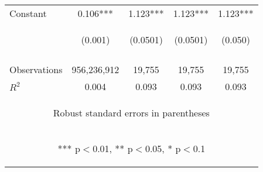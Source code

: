 \documentclass[]{article}
\begin{document}
\begin{center}
\begin{tabular}{lcccc}
Constant & 0.106*** & 1.123*** & 1.123*** & 1.123*** \\
 & \begin{footnotesize}(0.001)\end{footnotesize} & \begin{footnotesize}(0.0501)\end{footnotesize} & \begin{footnotesize}(0.0501)\end{footnotesize} & \begin{footnotesize}(0.050)\end{footnotesize} \\
\vspace{4pt} & \begin{footnotesize}\end{footnotesize} & \begin{footnotesize}\end{footnotesize} & \begin{footnotesize}\end{footnotesize} & \begin{footnotesize}\end{footnotesize} \\
Observations & 956,236,912 & 19,755 & 19,755 & 19,755 \\
 $R^2$ & 0.004 & 0.093 & 0.093 & 0.093 \\ \hline
\multicolumn{5}{c}{\begin{footnotesize} Robust standard errors in parentheses\end{footnotesize}} \\
\multicolumn{5}{c}{\begin{footnotesize} *** p$<$0.01, ** p$<$0.05, * p$<$0.1\end{footnotesize}} \\
\end{tabular}
\end{center}
\end{document}
